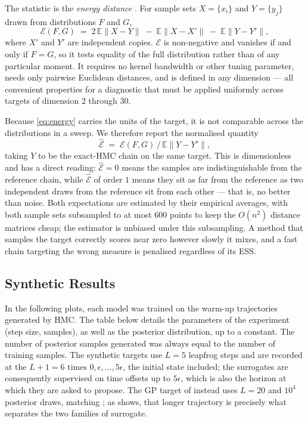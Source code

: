 \documentclass{article}
\theoremstyle{plain}
\theoremstyle{definition}
\theoremstyle{remark}
\begin{document}
The statistic is the \emph{energy distance} \cite{szekely2013energy}. For
sample sets $X = \{x_i\}$ and $Y = \{y_j\}$ drawn from distributions $F$ and
$G$,
\begin{equation}
    \mathcal{E}(F, G) \;=\; 2\,\mathbb{E}\|X - Y\| \;-\; \mathbb{E}\|X - X'\|
                        \;-\; \mathbb{E}\|Y - Y'\|,
    \label{eq:energy}
\end{equation}
where $X'$ and $Y'$ are independent copies. $\mathcal{E}$ is non-negative and
vanishes if and only if $F = G$, so it tests equality of the full distribution
rather than of any particular moment. It requires no kernel bandwidth or other
tuning parameter, needs only pairwise Euclidean distances, and is defined in
any dimension --- all convenient properties for a diagnostic that must be
applied uniformly across targets of dimension $2$ through $30$.

Because \eqref{eq:energy} carries the units of the target, it is not comparable
across the distributions in a sweep. We therefore report the normalised
quantity
\begin{equation}
    \widehat{\mathcal{E}} \;=\; \mathcal{E}(F, G) \,/\, \mathbb{E}\|Y - Y'\|,
    \label{eq:energy-norm}
\end{equation}
taking $Y$ to be the exact-HMC chain on the same target. This is dimensionless
and has a direct reading: $\widehat{\mathcal{E}} = 0$ means the samples are
indistinguishable from the reference chain, while $\widehat{\mathcal{E}}$ of
order $1$ means they sit as far from the reference as two independent draws
from the reference sit from each other --- that is, no better than noise. Both
expectations are estimated by their empirical averages, with both sample sets
subsampled to at most $600$ points to keep the $O(n^2)$ distance matrices
cheap; the estimator is unbiased under this subsampling. A method that samples
the target correctly scores near zero however slowly it mixes, and a fast
chain targeting the wrong measure is penalised regardless of its ESS.


\subsection{Synthetic Results}
In the following plots, each model was trained on the warm-up trajectories
generated by HMC. The table below details the parameters of the experiment
(step size, samples), as well as the posterior distribution, up to a constant.
The number of posterior samples generated was always equal to the number of
training samples. The synthetic targets use $L = 5$ leapfrog steps and are
recorded at the $L+1 = 6$ times $0, \epsilon, \ldots, 5\epsilon$, the initial
state included; the surrogates are consequently supervised on time offsets up
to $5\epsilon$, which is also the horizon at which they are asked to propose.
The GP target of  instead uses $L = 20$ and $10^4$ posterior
draws, matching \citet{Li_2019}; as  shows, that longer trajectory
is precisely what separates the two families of surrogate.
\end{document}
